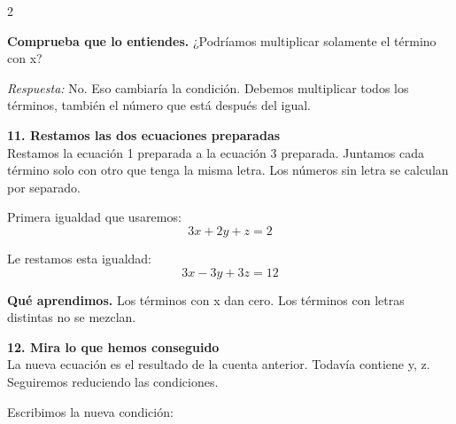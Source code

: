\documentclass[11pt,a4paper,landscape]{article}
\begin{document}
\begin{multicols*}{2}
\begin{minipage}{\linewidth}
\par\smallskip\textbf{Comprueba que lo entiendes.} ¿Podríamos multiplicar solamente el término con x?\par\textit{Respuesta:} No. Eso cambiaría la condición. Debemos multiplicar todos los términos, también el número que está después del igual.
\end{minipage}\par\medskip
\noindent\begin{minipage}{\linewidth}\textbf{11. Restamos las dos ecuaciones preparadas}\\[2pt]Restamos la ecuación 1 preparada a la ecuación 3 preparada. Juntamos cada término solo con otro que tenga la misma letra. Los números sin letra se calculan por separado.
\par{}\par\smallskip
\par\smallskip Primera igualdad que usaremos:
\[3x + 2y + z = 2\]
\par\smallskip Le restamos esta igualdad:
\[3x - 3y + 3z = 12\]
\par\smallskip\textbf{Qué aprendimos.} Los términos con x dan cero. Los términos con letras distintas no se mezclan.
\end{minipage}\par\medskip
\noindent\begin{minipage}{\linewidth}\textbf{12. Mira lo que hemos conseguido}\\[2pt]La nueva ecuación es el resultado de la cuenta anterior. Todavía contiene y, z. Seguiremos reduciendo las condiciones.
\par\smallskip Escribimos la nueva condición:

\end{minipage}
\end{multicols*}
\end{document}
